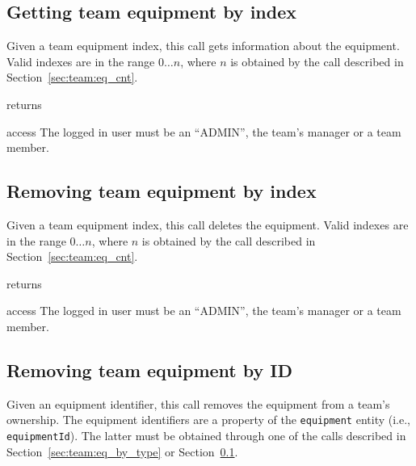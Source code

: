 \subsection{Getting team equipment by index}
\label{sec:team:eq_by_idx}

Given a team equipment index, this call gets information about the equipment.
Valid indexes are in the range $0 \ldots n$, where $n$ is obtained by the call
described in Section~\ref{sec:team:eq_cnt}.

\begin{apidata}{returns}
  \begin{datalist}
  \end{datalist}
\end{apidata}
\begin{apidata}{access}
The logged in user must be an ``ADMIN'', the team's manager or a team member.
\end{apidata}


\subsection{Removing team equipment by index}

Given a team equipment index, this call deletes the equipment.
Valid indexes are in the range $0 \ldots n$, where $n$ is obtained by the call
described in Section~\ref{sec:team:eq_cnt}.

\begin{apidata}{returns}
  \begin{datalist}
  \end{datalist}
\end{apidata}
\begin{apidata}{access}
The logged in user must be an ``ADMIN'', the team's manager or a team member.
\end{apidata}


\subsection{Removing team equipment by ID}

Given an equipment identifier, this call removes the equipment from a team's
ownership. The equipment identifiers are a property of the \texttt{equipment}
entity (i.e., \texttt{equipmentId}). The latter must be obtained through one of
the calls described in Section~\ref{sec:team:eq_by_type} or
Section~\ref{sec:team:eq_by_idx}.

